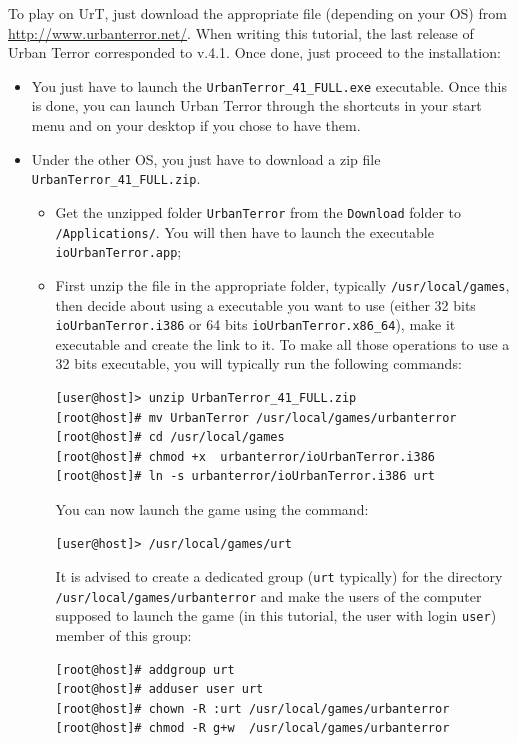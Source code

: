To play on UrT, just download the appropriate file (depending on your OS) from
\url{http://www.urbanterror.net/}. 
When writing this tutorial, the last release of Urban Terror corresponded to v.4.1.
Once done, just proceed to the installation: 
\begin{itemize}
\item[\windows] You just have to launch the
  \texttt{UrbanTerror\_41\_FULL.exe} executable. 
  Once this is done, you can launch Urban Terror through the shortcuts in your
  start menu and on your desktop if you chose to have them.
\item[\linux\macosx] Under the other OS, you just have to download a zip file
  \texttt{UrbanTerror\_41\_FULL.zip}. 
  \begin{itemize}
  \item[\macosx] Get the unzipped folder \texttt{UrbanTerror} from the
    \texttt{Download} folder to \texttt{/Applications/}. 
    You will then have to launch the executable \texttt{ioUrbanTerror.app};
  \item[\linux] First unzip the file in the appropriate folder, 
    typically \texttt{/usr/local/games}, then decide about using a executable
    you want to use (either 32 bits \texttt{ioUrbanTerror.i386} or 64 bits
    \texttt{ioUrbanTerror.x86\_64}), make it executable and create the link to
    it. 
    To make all those operations to use a 32 bits executable, you will typically
    run the following commands:
    \begin{lstlisting}[style=command]
[user@host]> unzip UrbanTerror_41_FULL.zip  
[root@host]# mv UrbanTerror /usr/local/games/urbanterror
[root@host]# cd /usr/local/games
[root@host]# chmod +x  urbanterror/ioUrbanTerror.i386
[root@host]# ln -s urbanterror/ioUrbanTerror.i386 urt  
    \end{lstlisting}
    You can now launch the game using the command: 
    \begin{lstlisting}[style=command]
[user@host]> /usr/local/games/urt
    \end{lstlisting}
    It is advised to create a dedicated group (\texttt{urt} typically) for the directory
    \texttt{/usr/local/games/urbanterror} and make the users of the computer
    supposed to launch the game (in this tutorial, the user with login
    \texttt{user}) member of this group: 
    \begin{lstlisting}[style=command]
[root@host]# addgroup urt  
[root@host]# adduser user urt        
[root@host]# chown -R :urt /usr/local/games/urbanterror
[root@host]# chmod -R g+w  /usr/local/games/urbanterror  
    \end{lstlisting}
  \end{itemize}
\end{itemize}

